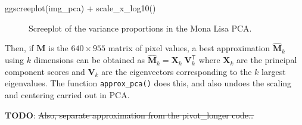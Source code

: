 \documentclass[
  letterpaper,
  10pt,
  krantz2]{krantz}
\makeatletter
\newenvironment{Shaded}{\begin{snugshade}}{\end{snugshade}}
\newcommand{\FunctionTok}[1]{\textcolor[rgb]{0.28,0.35,0.67}{#1}}
\newcommand{\NormalTok}[1]{\textcolor[rgb]{0.00,0.23,0.31}{#1}}
\newcommand{\SpecialCharTok}[1]{\textcolor[rgb]{0.37,0.37,0.37}{#1}}
\newenvironment{kframe}{%
  \medskip{}
  \setlength{\fboxsep}{.8em}
  \def\at@end@of@kframe{}%
  \ifinner\ifhmode%
  \def\at@end@of@kframe{\end{minipage}}%
  \begin{minipage}{\columnwidth}%
  \fi\fi%
  \def\FrameCommand##1{\hskip\@totalleftmargin \hskip-\fboxsep
  \colorbox{shadecolor}{##1}\hskip-\fboxsep
      \hskip-\linewidth \hskip-\@totalleftmargin \hskip\columnwidth}%
  \MakeFramed {\advance\hsize-\width
    \@totalleftmargin\z@ \linewidth\hsize
    \@setminipage}}%
{\par\unskip\endMakeFramed%
  \at@end@of@kframe}
\renewenvironment{Shaded}{\begin{kframe}}{\end{kframe}}
\makeatother
\begin{document}
\begin{Shaded}
\begin{Highlighting}[]
\FunctionTok{ggscreeplot}\NormalTok{(img\_pca) }\SpecialCharTok{+}
  \FunctionTok{scale\_x\_log10}\NormalTok{()}
\end{Highlighting}
\end{Shaded}

\begin{figure}[H]


\caption{\label{fig-mona-screeplot}Screeplot of the variance proportions
in the Mona Lisa PCA.}

\end{figure}%

Then, if \(\mathbf{M}\) is the \(640 \times 955\) matrix of pixel
values, a best approximation \(\widehat{\mathbf{M}}_k\) using \(k\)
dimensions can be obtained as
\(\widehat{\mathbf{M}}_k = \mathbf{X}_k\;\mathbf{V}_k^\mathsf{T}\) where
\(\mathbf{X}_k\) are the principal component scores and \(\mathbf{V}_k\)
are the eigenvectors corresponding to the \(k\) largest eigenvalues. The
function \texttt{approx\_pca()} does this, and also undoes the scaling
and centering carried out in PCA.

\textbf{TODO}: \st{Also, separate approximation from the pivot\_longer
code\ldots{}}
\end{document}
